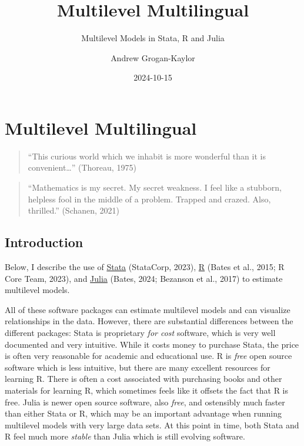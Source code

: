 \documentclass[
  letterpaper,
  DIV=11,
  numbers=noendperiod]{scrreprt}
\title{Multilevel Multilingual}
\subtitle{Multilevel Models in Stata, R and Julia}
\author{Andrew Grogan-Kaylor}
\date{2024-10-15}
\renewcommand*\contentsname{Table of contents}
\newcommand\contentsname{Table of contents}
\begin{document}
\maketitle

\renewcommand*\contentsname{Table of contents}
{
\hypersetup{linkcolor=}
\setcounter{tocdepth}{2}
\tableofcontents
}
\listoftables


\chapter{Multilevel Multilingual}\label{multilevel-multilingual}

\begin{quote}
``This curious world which we inhabit is more wonderful than it is
convenient\ldots{}'' (Thoreau, 1975)
\end{quote}

\begin{quote}
``Mathematics is my secret. My secret weakness. I feel like a stubborn,
helpless fool in the middle of a problem. Trapped and crazed. Also,
thrilled.'' (Schanen, 2021)
\end{quote}

\section{Introduction}\label{introduction}

Below, I describe the use of \href{https://www.stata.com/}{Stata}
(StataCorp, 2023), \href{https://www.r-project.org/}{R} (Bates et al.,
2015; R Core Team, 2023), and \href{https://www.julialang.org/}{Julia}
(Bates, 2024; Bezanson et al., 2017) to estimate multilevel models.

All of these software packages can estimate multilevel models and can
visualize relationships in the data. However, there are substantial
differences between the different packages: Stata is proprietary
\emph{for cost} software, which is very well documented and very
intuitive. While it costs money to purchase Stata, the price is often
very reasonable for academic and educational use. R is \emph{free} open
source software which is less intuitive, but there are many excellent
resources for learning R. There is often a cost associated with
purchasing books and other materials for learning R, which sometimes
feels like it offsets the fact that R is free. Julia is newer open
source software, also \emph{free}, and ostensibly much faster than
either Stata or R, which may be an important advantage when running
multilevel models with very large data sets. At this point in time, both
Stata and R feel much more \emph{stable} than Julia which is still
evolving software.
\end{document}
